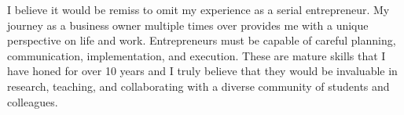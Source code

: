 \documentclass[12pt]{article}
\begin{document}


I believe it would be remiss to omit my experience as a serial entrepreneur.  My journey as a business owner multiple times over provides me
with a unique perspective on life and work.  Entrepreneurs must be capable of careful planning, communication, implementation, and
execution.  These are mature skills that I have honed for over 10 years and I truly believe that they would be invaluable in research,
teaching, and collaborating with a diverse community of students and colleagues.
\end{document}
